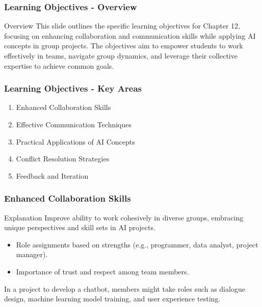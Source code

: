 \documentclass[aspectratio=169]{beamer}
\begin{document}
\begin{frame}[fragile]
    \frametitle{Learning Objectives - Overview}
    \begin{block}{Overview}
        This slide outlines the specific learning objectives for Chapter 12, focusing on enhancing collaboration and communication skills while applying AI concepts in group projects. 
        The objectives aim to empower students to work effectively in teams, navigate group dynamics, and leverage their collective expertise to achieve common goals.
    \end{block}
\end{frame}

\begin{frame}[fragile]
    \frametitle{Learning Objectives - Key Areas}
    \begin{enumerate}
        \item Enhanced Collaboration Skills
        \item Effective Communication Techniques
        \item Practical Applications of AI Concepts
        \item Conflict Resolution Strategies
        \item Feedback and Iteration
    \end{enumerate}
\end{frame}

\begin{frame}[fragile]
    \frametitle{Enhanced Collaboration Skills}
    \begin{block}{Explanation}
        Improve ability to work cohesively in diverse groups, embracing unique perspectives and skill sets in AI projects.
    \end{block}
    \begin{itemize}
        \item Role assignments based on strengths (e.g., programmer, data analyst, project manager).
        \item Importance of trust and respect among team members.
    \end{itemize}
    \begin{example}
        In a project to develop a chatbot, members might take roles such as dialogue design, machine learning model training, and user experience testing.
    \end{example}
\end{frame}
\end{document}
